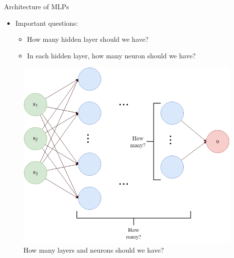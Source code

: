 \documentclass[compress,oilve,t]{beamer}
\begin{document}
\begin{frame}{Architecture of MLPs}
	\begin{itemize}
		\item Important questions:
		\begin{itemize}
			\item How many hidden layer should we have?
			\item In each hidden layer, how many neuron should we have?
		\end{itemize}
	\end{itemize}
	\begin{figure}[H]
		\centering
		\includegraphics[height=0.6\textheight]{Figs/how_many_layer.png}
		\caption{How many layers and neurons should we have?}
	\end{figure}
\end{frame}
\end{document}
